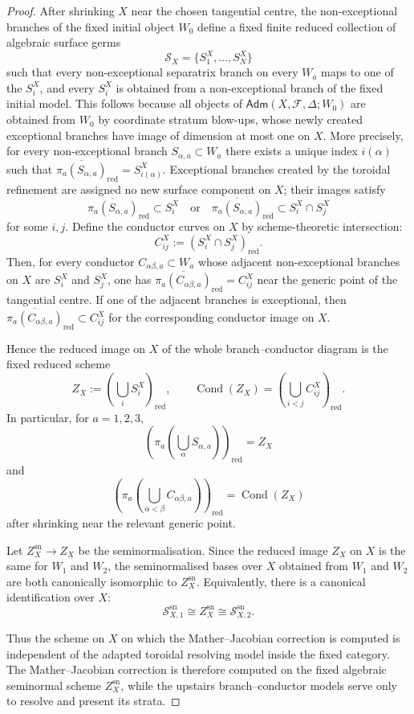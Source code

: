 \documentclass[11pt]{amsart}
\numberwithin{equation}{section}
\theoremstyle{plain}
\theoremstyle{definition}
\newcommand{\sn}{\mathrm{sn}}
\newcommand{\Adm}{\mathsf{Adm}}
\newcommand{\red}{\mathrm{red}}
\newcommand{\cF}{\mathcal F}
\begin{document}
\begin{proof}
After
shrinking \(X\) near the chosen tangential centre, the non-exceptional branches of the fixed initial object $W_0$ define a fixed finite
reduced collection of algebraic surface germs
\[
\mathcal S_X=\{S_1^X,\ldots,S_N^X\}
\]
such that every non-exceptional separatrix branch on every \(W_a\) maps to
one of the \(S_i^X\), and every \(S_i^X\) is obtained from a non-exceptional branch of the fixed initial model.  This follows because all objects of \(\Adm(X,\cF,\Delta;W_0)\) are obtained from \(W_0\) by coordinate stratum blow-ups, whose newly created exceptional branches have image of dimension at most one on \(X\). More
precisely, for every non-exceptional branch \(S_{\alpha,a}\subset W_a\)
there exists a unique index \(i(\alpha)\) such that
$
\overline{\pi_a(S_{\alpha,a})}_{\red}=S_{i(\alpha)}^X.
$
Exceptional branches created by the toroidal refinement are assigned no new
surface component on $X$; their images satisfy
\[
\overline{\pi_a(S_{\alpha,a})}_{\red}\subset S_i^X
\quad\text{or}\quad
\overline{\pi_a(S_{\alpha,a})}_{\red}\subset S_i^X\cap S_j^X
\]
for some \(i,j\).
Define the conductor curves on $X$ by scheme-theoretic intersection:
\[
C_{ij}^X:=(S_i^X\cap S_j^X)_{\red}.
\]
Then, for every conductor \(C_{\alpha\beta,a}\subset W_a\) whose adjacent
non-exceptional branches on $X$ are \(S_i^X\) and \(S_j^X\), one has
$
\overline{\pi_a(C_{\alpha\beta,a})}_{\red}=C_{ij}^X
$
near the generic point of the tangential centre. If one of the adjacent
branches is exceptional, then
$
\overline{\pi_a(C_{\alpha\beta,a})}_{\red}\subset C_{ij}^X
$
for the corresponding conductor image on $X$.

Hence the reduced image on $X$ of the whole branch--conductor diagram is
the fixed reduced scheme
\[
Z_X
:=
\left(
\bigcup_i S_i^X
\right)_{\red},
\qquad
\operatorname{Cond}(Z_X)
=
\left(
\bigcup_{i<j} C_{ij}^X
\right)_{\red}.
\]
In particular, for \(a=1,2,3\),
\[
\left(\pi_a\left(\bigcup_\alpha S_{\alpha,a}\right)\right)_{\red}=Z_X
\]
and
\[
\left(\pi_a\left(\bigcup_{\alpha<\beta}C_{\alpha\beta,a}\right)\right)_{\red}
=
\operatorname{Cond}(Z_X)
\]
after shrinking near the relevant generic point.

Let
$
Z_X^{\sn}\longrightarrow Z_X
$
be the seminormalisation. Since the reduced image \(Z_X\) on \(X\) is the
same for \(W_1\) and \(W_2\), the seminormalised bases over \(X\) obtained
from \(W_1\) and \(W_2\) are both canonically isomorphic to \(Z_X^{\sn}\).
Equivalently, there is a canonical identification over \(X\):
\[
\mathscr S_{X,1}^{\sn}
\cong
Z_X^{\sn}
\cong
\mathscr S_{X,2}^{\sn}.
\]

Thus the scheme on $X$ on which the Mather--Jacobian correction is
computed is independent of the adapted toroidal resolving model inside the
fixed category.  The Mather--Jacobian correction is therefore computed on the
fixed algebraic seminormal scheme \(Z_X^{\sn}\), while the upstairs
branch--conductor models serve only to resolve and present its strata.
\end{proof}
\end{document}

